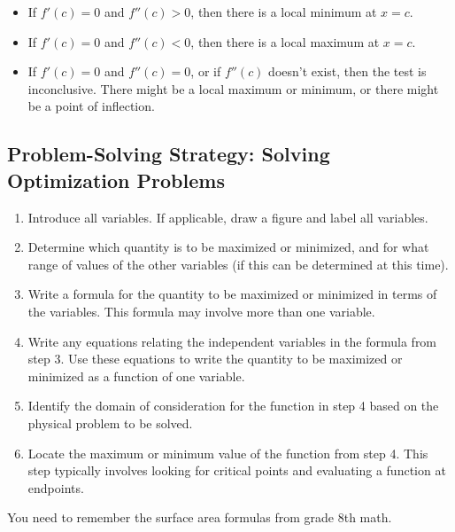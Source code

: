 \documentclass{article}
\begin{document}
\begin{itemize}
\item If $f'(c)=0$ and $f''(c)>0$, then there is a local minimum at $x=c$.
\item If $f'(c)=0$ and $f''(c)<0$, then there is a local maximum at $x=c$.
\item If $f'(c)=0$ and $f''(c)=0$, or if $f''(c)$ doesn't exist, then the test is inconclusive. There might be a local maximum or minimum, or there might be a point of inflection.
\end{itemize}
\newpage 
\subsection{Problem-Solving Strategy: Solving Optimization Problems}

\begin{enumerate}
    \item Introduce all variables. If applicable, draw a figure and label all variables.
    \item Determine which quantity is to be maximized or minimized, and for what range of values of the other variables (if this can be determined at this time).
    \item Write a formula for the quantity to be maximized or minimized in terms of the variables. This formula may involve more than one variable.
    \item Write any equations relating the independent variables in the formula from step 3. Use these equations to write the quantity to be maximized or minimized as a function of one variable.
    \item Identify the domain of consideration for the function in step 4 based on the physical problem to be solved.
    \item Locate the maximum or minimum value of the function from step 4. This step typically involves looking for critical points and evaluating a function at endpoints.
\end{enumerate}
You need to remember the surface area formulas from grade 8th math.
\end{document}
